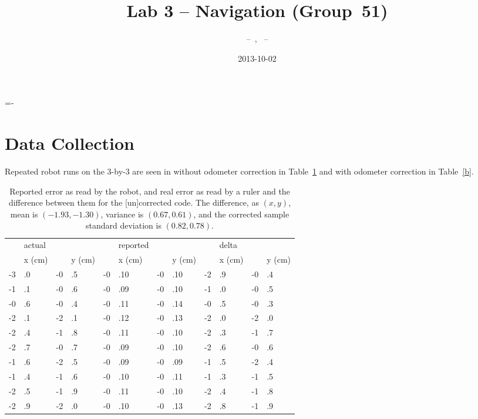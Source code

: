 \documentclass[twocolumn]{article}
\author{\bname~--~\bid, \name~--~\id}
\title{Lab 3 -- Navigation (Group~51)}
\date{2013-10-02}
\begin{document}
\abovedisplayskip=-\baselineskip

\maketitle



\section{Data Collection}

Repeated robot runs on the 3-by-3 are seen in without odometer correction in Table~\ref{a} and with odometer correction in Table~\ref{b}.

\begin{table*}[htb]
\begin{center}\begin{tabular}{r@{}l r@{}l r@{}l r@{}l r@{}l r@{}l}
&actual&&& &reported&&& &delta&& \\
&x (cm)& &y (cm)& &x (cm)& &y (cm)& &x (cm)& &y (cm) \\
\hline
-3&.0& -0&.5& -0&.10& -0&.10& -2&.9& -0&.4 \\
-1&.1& -0&.6& -0&.09& -0&.10& -1&.0& -0&.5 \\
-0&.6& -0&.4& -0&.11& -0&.14& -0&.5& -0&.3 \\
-2&.1& -2&.1& -0&.12& -0&.13& -2&.0& -2&.0 \\
-2&.4& -1&.8& -0&.11& -0&.10& -2&.3& -1&.7 \\
-2&.7& -0&.7& -0&.09& -0&.10& -2&.6& -0&.6 \\
-1&.6& -2&.5& -0&.09& -0&.09& -1&.5& -2&.4 \\
-1&.4& -1&.6& -0&.10& -0&.11& -1&.3& -1&.5 \\
-2&.5& -1&.9& -0&.11& -0&.10& -2&.4& -1&.8 \\
-2&.9& -2&.0& -0&.10& -0&.13& -2&.8& -1&.9 \\
\end{tabular}\end{center}
\caption{Reported error as read by the robot, and real error as read by a ruler and the difference between them for the [un]corrected code.
The difference, as $(x, y)$, mean is $(-1.93, -1.30)$, variance is $(0.67, 0.61)$, and the corrected sample standard deviation is $(0.82, 0.78)$.}
\label{a}
\end{table*}
\end{document}
